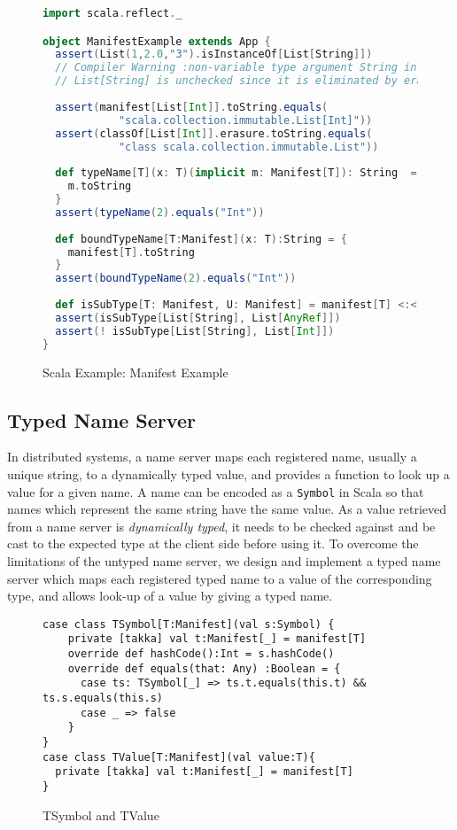 \begin{figure}[h]
\begin{lstlisting}[language=scala]
import scala.reflect._

object ManifestExample extends App {
  assert(List(1,2.0,"3").isInstanceOf[List[String]])
  // Compiler Warning :non-variable type argument String in type 
  // List[String] is unchecked since it is eliminated by erasure
  
  assert(manifest[List[Int]].toString.equals(
            "scala.collection.immutable.List[Int]"))
  assert(classOf[List[Int]].erasure.toString.equals(
            "class scala.collection.immutable.List"))
  
  def typeName[T](x: T)(implicit m: Manifest[T]): String  = {
    m.toString
  }
  assert(typeName(2).equals("Int"))
    
  def boundTypeName[T:Manifest](x: T):String = {
    manifest[T].toString
  }
  assert(boundTypeName(2).equals("Int"))
  
  def isSubType[T: Manifest, U: Manifest] = manifest[T] <:< manifest[U]
  assert(isSubType[List[String], List[AnyRef]])
  assert(! isSubType[List[String], List[Int]]) 
}
\end{lstlisting}
\caption{Scala Example: Manifest Example}
\label{scala_manifest_example}
\end{figure}







\subsection{Typed Name Server}
\label{nameserver}

In distributed systems, a name server maps each registered name, usually a
unique string, to a dynamically typed value, and provides a function to look up 
a value for a
given name. A name can be encoded as a {\tt Symbol} in Scala so that names
which represent the same string have the same value.  As a value retrieved from 
a name server is {\it dynamically typed}, it needs to be checked against and be 
cast to the expected type at the client side before using it.
To overcome the limitations of the untyped name server, we design and implement
a typed name server which maps each registered typed name to a value of the
corresponding type, and allows look-up of a value by giving a typed name.

\begin{figure}[!h]
\label{tsymbol}
\begin{lstlisting}
case class TSymbol[T:Manifest](val s:Symbol) {
    private [takka] val t:Manifest[_] = manifest[T]
    override def hashCode():Int = s.hashCode()  
    override def equals(that: Any) :Boolean = {
      case ts: TSymbol[_] => ts.t.equals(this.t) && ts.s.equals(this.s)
      case _ => false
    }
}
case class TValue[T:Manifest](val value:T){
  private [takka] val t:Manifest[_] = manifest[T]
}
\end{lstlisting}
\caption{TSymbol and TValue}
\end{figure}

